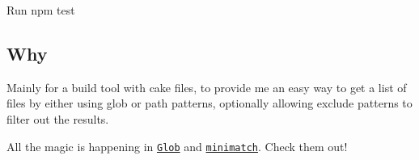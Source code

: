 Run {\ttfamily npm test}

\subsection*{Why}

Mainly for a build tool with cake files, to provide me an easy way to get a list of files by either using glob or path patterns, optionally allowing exclude patterns to filter out the results.

All the magic is happening in \href{https://github.com/isaacs/node-glob}{\tt Glob} and \href{https://github.com/isaacs/minimatch}{\tt minimatch}. Check them out! 